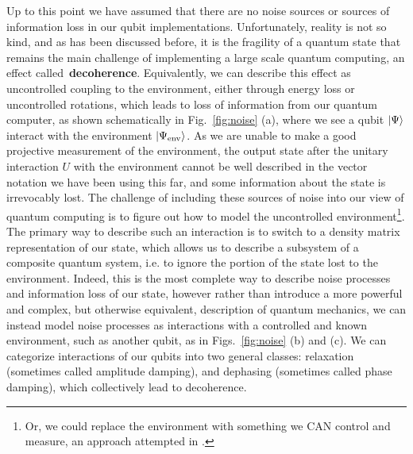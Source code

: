 Up to this point we have assumed that there are no noise sources or sources of information loss in our
qubit implementations. Unfortunately, reality is not so kind, and as has been discussed before, it is the
fragility of a quantum state that remains the main challenge of implementing a large scale quantum computing,
an effect called~\textbf{decoherence}. Equivalently, we can describe this effect as uncontrolled coupling to the environment, either through
energy loss or uncontrolled rotations, which leads to loss of information from our quantum computer, as shown schematically
in Fig.~\ref{fig:noise} (a), where we see a qubit $\ket{\Psi}$ interact with the environment $\ket{\Psi_{\textrm{env}}}$.
As we are unable to make a good projective measurement of the environment, the output
state after the unitary interaction $U$ with the environment cannot be well described in the vector notation we have been using
this far, and some information about the state is irrevocably lost. The challenge of including
these sources of noise into our view of quantum computing is to figure out how to model the uncontrolled
environment\footnote{Or, we could replace the environment with something we CAN control and measure, an approach attempted
in \cite{s41586-019-1287-z}.}.
The primary way to describe such an interaction is to switch to a density matrix representation of our state, which allows us
to describe a subsystem of a composite quantum system, i.e. to ignore the portion of the state lost to the environment.
Indeed, this is the most complete way to describe noise processes and information loss of our state, however rather
than introduce a more powerful and complex, but otherwise equivalent, description of quantum mechanics, we can instead model
noise processes as interactions with a controlled and known environment, such as another qubit, as in Figs.~\ref{fig:noise} (b) and (c).
We can categorize interactions of our qubits into two general classes: relaxation (sometimes called amplitude
damping), and dephasing (sometimes called phase damping), which collectively lead to decoherence.

